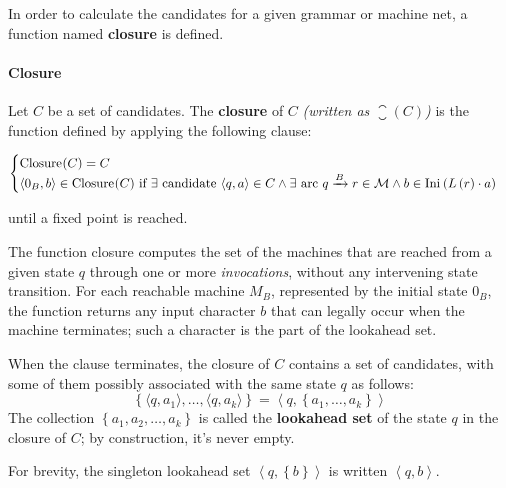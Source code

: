 \documentclass[english]{article}
\begin{document}
In order to calculate the candidates for a given grammar or machine net, a function named \textbf{closure} is defined.

\paragraph{Closure}
\label{par:closure}

Let \(C\) be a set of candidates.
The \textbf{closure} of \(C\) \textit{(written as \(\closure(C)\))} is the function defined by applying the following clause:

\begin{gather*}
  \begin{cases}
    \closure(C) = C                                                                                                                                                                                                                         \\
    \langle 0_B, b \rangle \in \closure(C) \ \text{if} \ \exists \ \text{candidate} \ \langle q,a \rangle \in C \land \exists \ \text{arc} \  q\xrightarrow{B} r \in \mathcal{M} \land b \in \Ini \left( L \left( r \right) \cdot a \right) \\
  \end{cases}
\end{gather*}

until a fixed point is reached.

\bigskip
The function closure computes the set of the machines that are reached from a given state \(q\) through one or more \textit{invocations}, without any intervening state transition.
For each reachable machine \(M_B\), represented by the initial state \(0_B\), the function returns any input character \(b\) that can legally occur when the machine terminates;
such a character is the part of the lookahead set.

When the clause terminates, the closure of \(C\) contains a set of candidates, with some of them possibly associated with the same state \(q\) as follows:
\[ \left\{ \langle q, a_1 \rangle, \ldots, \langle q, a_k \rangle \right\} = \left\langle q, \left\{ a_1, \ldots, a_k \right\} \right\rangle \]
The collection \(\left\{ a_1, a_2, \ldots, a_k \right\}\) is called the \textbf{lookahead set} of the state \(q\) in the closure of \(C\);
by construction, it's never empty.

\bigskip
For brevity, the singleton lookahead set \(\left\langle q, \left\{ b \right\} \right\rangle\) is written \(\left\langle q, b \right\rangle\).
\end{document}
